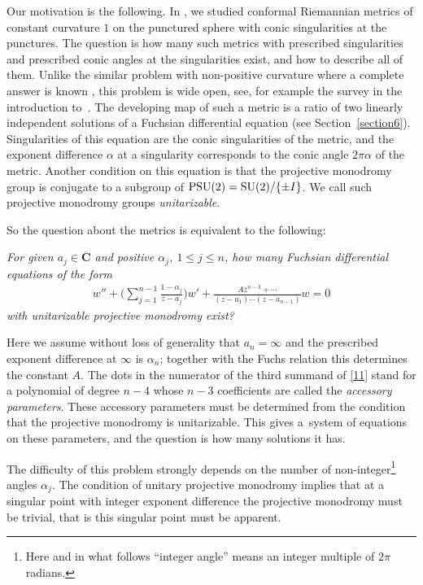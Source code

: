 \documentclass[pdftex]{sigma}
\numberwithin{equation}{section}
\def\bC{\mathbf{\overline{C}}}
\begin{document}
Our motivation is the following. In \cite{E,EGT1,EGT}, we studied conformal Riemannian metrics of constant curvature $1$ on the punctured sphere with conic singularities at the punctures. The question is how many such metrics with prescribed singularities and prescribed conic angles at the singularities exist, and how to describe all of them. Unlike the similar problem with non-positive curvature where a complete answer is known \cite{H, P,T}, this problem is wide open, see, for example the survey in the introduction to~\cite{EGT1}. The developing map of such a metric is a ratio of two linearly independent solutions of a Fuchsian differential equation (see Section~\ref{section6}). Singularities of this equation are the conic singularities of the metric, and the exponent difference $\alpha$ at a singularity corresponds to the conic angle $2\pi\alpha$ of the metric. Another condition on this equation is that the projective monodromy group is conjugate to a subgroup of ${\rm PSU}(2)={\rm SU}(2)/\{\pm I\}$. We call such projective monodromy groups {\em unitarizable}.

So the question about the metrics is equivalent to the following:

{\em For given $a_j\in\bC$ and positive $\alpha_j$, $1\leq j\leq n$, how many Fuchsian differential equations of the form
\begin{gather}\label{11}
w''+\biggl(\sum_{j=1}^{n-1}\frac{1-\alpha_j}{z-a_j}\biggr)w'+\frac{Az^{n-3}+\cdots}{(z-a_1)\cdots(z-a_{n-1})}w=0
\end{gather}
with unitarizable projective monodromy exist?}

Here we assume without loss of generality that $a_n=\infty$ and the prescribed exponent difference at $\infty$ is $\alpha_n$; together with the Fuchs relation this determines the constant $A$. The dots in the numerator of the third summand of \eqref{11} stand for a polynomial of degree $n-4$ whose $n-3$ coefficients are called the {\em accessory parameters}. These accessory parameters must be determined from the condition that the projective monodromy is unitarizable. This gives a~system of equations on these parameters, and the question is how many solutions it has.

The difficulty of this problem strongly depends on the number of non-integer\footnote{Here and in what follows ``integer angle'' means an integer multiple of $2\pi$ radians.} angles $\alpha_j$. The condition of unitary projective monodromy implies that at a singular point with integer exponent difference the projective monodromy must be trivial, that is this singular point must be apparent.
\end{document}
